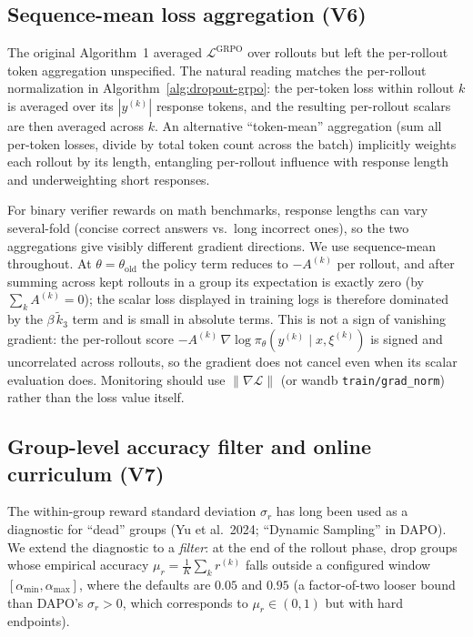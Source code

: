 \documentclass[11pt]{article}
\theoremstyle{definition}
\theoremstyle{remark}
\newcommand{\Loss}{\mathcal{L}}
\begin{document}
\subsection{Sequence-mean loss aggregation (V6)}

The original Algorithm~1 averaged $\Loss^{\mathrm{GRPO}}$ over rollouts but
left the per-rollout token aggregation unspecified.  The natural reading
matches the per-rollout normalization in
Algorithm~\ref{alg:dropout-grpo}: the per-token loss within rollout $k$
is averaged over its $|y^{(k)}|$ response tokens, and the resulting
per-rollout scalars are then averaged across $k$.  An alternative
``token-mean'' aggregation (sum all per-token losses, divide by total
token count across the batch) implicitly weights each rollout by its
length, entangling per-rollout influence with response length and
underweighting short responses.

For binary verifier rewards on math benchmarks, response lengths can vary
several-fold (concise correct answers vs.\ long incorrect ones), so the
two aggregations give visibly different gradient directions.  We use
sequence-mean throughout.  At $\theta = \theta_{\mathrm{old}}$ the policy
term reduces to $-A^{(k)}$ per rollout, and after summing across kept
rollouts in a group its expectation is exactly zero (by
$\sum_k A^{(k)} = 0$); the scalar loss displayed in training logs is
therefore dominated by the $\beta\,\tilde k_3$ term and is small in
absolute terms.  This is not a sign of vanishing gradient: the
per-rollout score $-A^{(k)}\,\nabla\log\pi_\theta(y^{(k)}\mid x,\xi^{(k)})$
is signed and uncorrelated across rollouts, so the gradient does not
cancel even when its scalar evaluation does.  Monitoring should use
$\|\nabla\Loss\|$ (or wandb \texttt{train/grad\_norm}) rather than the
loss value itself.

\subsection{Group-level accuracy filter and online curriculum (V7)}

The within-group reward standard deviation $\sigma_r$ has long been used
as a diagnostic for ``dead'' groups (Yu et al.\ 2024; ``Dynamic Sampling''
in DAPO).  We extend the diagnostic to a \emph{filter}: at the end of the
rollout phase, drop groups whose empirical accuracy
$\mu_r = \tfrac1K\sum_k r^{(k)}$ falls outside a configured window
$[\alpha_{\min}, \alpha_{\max}]$, where the defaults are $0.05$ and $0.95$
(a factor-of-two looser bound than DAPO's $\sigma_r > 0$, which
corresponds to $\mu_r \in (0, 1)$ but with hard endpoints).
\end{document}
